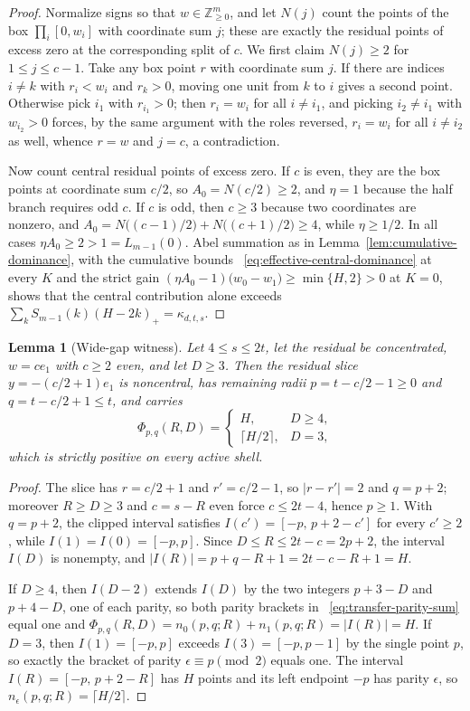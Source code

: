 \documentclass[pdflatex,sn-mathphys-num]{sn-jnl}
\theoremstyle{thmstyleone}
\newtheorem{lemma}[theorem]{Lemma}
\theoremstyle{thmstylethree}
\theoremstyle{thmstyletwo}
\newcommand{\Z}{\mathbb Z}
\begin{document}
\begin{proof}
Normalize signs so that $w\in\Z_{\ge0}^m$, and let
$N(j)$ count the points of the box $\prod_i[0,w_i]$ with coordinate sum
$j$; these are exactly the residual points of excess zero at the
corresponding split of $c$.  We first claim $N(j)\ge2$ for $1\le j\le c-1$.
Take any box point $r$ with coordinate sum $j$.  If there are indices
$i\ne k$ with $r_i<w_i$ and $r_k>0$, moving one unit from $k$ to $i$ gives a
second point.  Otherwise pick $i_1$ with $r_{i_1}>0$; then $r_i=w_i$ for all
$i\ne i_1$, and picking $i_2\ne i_1$ with $w_{i_2}>0$ forces, by the same
argument with the roles reversed, $r_i=w_i$ for all $i\ne i_2$ as well,
whence $r=w$ and $j=c$, a contradiction.

Now count central residual points of excess zero.  If $c$ is even, they are
the box points at coordinate sum $c/2$, so $A_0=N(c/2)\ge2$, and $\eta=1$
because the half branch requires odd $c$.  If $c$ is odd, then
$c\ge3$ because two coordinates are nonzero, and
$A_0=N\bigl((c-1)/2\bigr)+N\bigl((c+1)/2\bigr)\ge4$, while $\eta\ge1/2$.  In
all cases $\eta A_0\ge2>1=L_{m-1}(0)$.  Abel summation as in
Lemma~\ref{lem:cumulative-dominance}, with the cumulative bounds
~\eqref{eq:effective-central-dominance} at every $K$ and the strict gain
$(\eta A_0-1)\bigl(w_0-w_1\bigr)\ge\min\{H,2\}>0$ at $K=0$, shows that the
central contribution alone exceeds
$\sum_kS_{m-1}(k)(H-2k)_+=\kappa_{d,t,s}$.
\end{proof}

\begin{lemma}[Wide-gap witness]
\label{lem:wide-gap-witness}
Let $4\le s\le2t$, let the residual be concentrated, $w=ce_1$ with $c\ge2$
even, and let $D\ge3$.  Then the residual slice $y=-(c/2+1)e_1$ is
noncentral, has remaining radii $p=t-c/2-1\ge0$ and $q=t-c/2+1\le t$, and
carries
\[
 \Phi_{p,q}(R,D)=
 \begin{cases}
  H,&D\ge4,\\
  \lceil H/2\rceil,&D=3,
 \end{cases}
\]
which is strictly positive on every active shell.
\end{lemma}

\begin{proof}
The slice has $r=c/2+1$ and $r'=c/2-1$, so $|r-r'|=2$ and $q=p+2$; moreover
$R\ge D\ge3$ and $c=s-R$ even force $c\le2t-4$, hence $p\ge1$.  With
$q=p+2$, the clipped interval satisfies $I(c')=[-p,\,p+2-c']$ for every
$c'\ge2$, while $I(1)=I(0)=[-p,p]$.  Since $D\le R\le2t-c=2p+2$, the
interval $I(D)$ is nonempty, and $|I(R)|=p+q-R+1=2t-c-R+1=H$.

If $D\ge4$, then $I(D-2)$ extends $I(D)$ by the two integers
$p+3-D$ and $p+4-D$, one of each parity, so both parity brackets in
~\eqref{eq:transfer-parity-sum} equal one and
$\Phi_{p,q}(R,D)=n_0(p,q;R)+n_1(p,q;R)=|I(R)|=H$.  If $D=3$, then
$I(1)=[-p,p]$ exceeds $I(3)=[-p,p-1]$ by the single point $p$, so exactly
the bracket of parity $\epsilon\equiv p\pmod2$ equals one.  The interval
$I(R)=[-p,\,p+2-R]$ has $H$ points and its left endpoint $-p$ has parity
$\epsilon$, so $n_\epsilon(p,q;R)=\lceil H/2\rceil$.
\end{proof}
\end{document}
